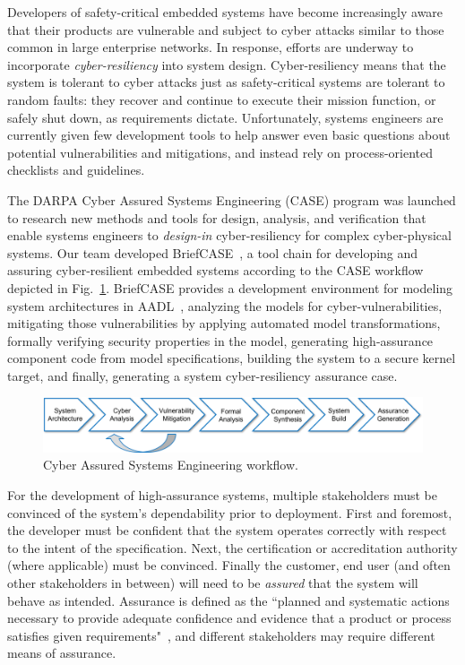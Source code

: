
Developers of safety-critical embedded systems have become increasingly aware that their products are vulnerable and subject to cyber attacks similar to those common in large enterprise networks.  In response, efforts are underway to incorporate \textit{cyber-resiliency} into system design.  Cyber-resiliency means that the system is tolerant to cyber attacks just as safety-critical systems are tolerant to random faults: they recover and continue to execute their mission function, or safely shut down, as requirements dictate.  Unfortunately, systems engineers are currently given few development tools to help answer even basic questions about potential vulnerabilities and mitigations, and instead rely on process-oriented checklists and guidelines.

The DARPA Cyber Assured Systems Engineering (CASE) program was launched to research new methods and tools for design, analysis, and verification that enable systems engineers to \textit{design-in} cyber-resiliency for complex cyber-physical systems. 
%
Our team developed BriefCASE~\cite{case-at-scale}, a tool chain for developing and assuring cyber-resilient embedded systems according to the CASE workflow depicted in Fig.~\ref{fig:workflow}. BriefCASE provides a development environment for modeling system architectures in AADL~\cite{feiler-aadl}, analyzing the models for cyber-vulnerabilities, mitigating those vulnerabilities by applying automated model transformations, formally verifying security properties in the model, generating high-assurance component code from model specifications, building the system to a secure kernel target, and finally, generating a system cyber-resiliency assurance case.  

\begin{figure}[h] 
	\centering 
	\includegraphics[width=\textwidth]{figs/workflow.png}
	\caption{Cyber Assured Systems Engineering workflow.}
	\label{fig:workflow} 
\end{figure}

For the development of high-assurance systems, multiple stakeholders must be convinced of the system's dependability prior to deployment.  First and foremost, the developer must be confident that the system operates correctly with respect to the intent of the specification.  Next, the certification or accreditation authority (where applicable) must be convinced.  Finally the customer, end user (and often other stakeholders in between) will need to be \textit{assured} that the system will behave as intended.  
Assurance is defined as the ``planned and systematic actions necessary to provide adequate confidence and evidence that a product or process satisfies given requirements"~\cite{do-178c}, and different stakeholders may require different means of assurance.  

